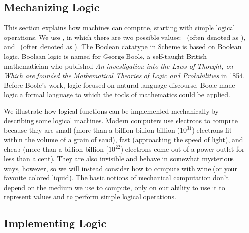 \begin{schemeregion}
\section{Mechanizing Logic}\label{sec:logic}


This section explains how machines can compute, starting with simple logical operations.  We use , in which there are two possible values: \true\ (often denoted as \bI), and \false\ (often denoted as \bO).  The Boolean datatype in Scheme is based on Boolean logic.  Boolean logic is named for George Boole, a self-taught British mathematician who published {\em An investigation into the Laws of Thought, on Which are founded the Mathematical Theories of Logic and Probabilities} in 1854.  Before Boole's work, logic focused on natural language discourse.  Boole made logic a formal language to which the tools of mathematics could be applied. 

We illustrate how logical functions can be implemented mechanically by describing some logical machines.  Modern computers use electrons to compute because they are small (more than a billion billion billion ($10^{31}$) electrons fit within the volume of a grain of sand), fast (approaching the speed of light), and cheap (more than a billion billion ($10^{22}$) electrons come out of a power outlet for less than a cent).   %
They are also invisible and behave in somewhat mysterious ways, however, so we will instead consider how to compute with wine (or your favorite colored liquid).  The basic notions of mechanical computation don't depend on the medium we use to compute, only on our ability to use it to represent values and to perform simple logical operations.

\subsection{Implementing Logic}


\end{schemeregion}
